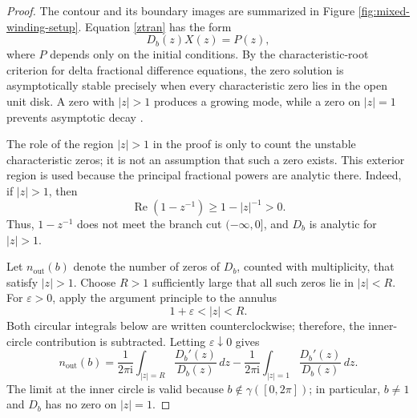 \documentclass[11pt,a4paper]{article}
\theoremstyle{definition}
\begin{document}
\begin{proof}
The contour and its boundary images are summarized in Figure \ref{fig:mixed-winding-setup}.
Equation \eqref{ztran} has the form
\begin{equation*}
D_b(z)X(z)=P(z),
\end{equation*}
where $P$ depends only on the initial conditions. By the characteristic-root criterion for delta fractional difference equations, the zero solution is asymptotically stable precisely when every characteristic zero lies in the open unit disk. A zero with $|z|>1$ produces a growing mode, while a zero on $|z|=1$ prevents asymptotic decay \cite{stanislawski2013stability,abu2013asymptotic,vcermak2015explicit,wei2024explicit}.

The role of the region $|z|>1$ in the proof is only to count the unstable characteristic zeros; it is not an assumption that such a zero exists. This exterior region is used because the principal fractional powers are analytic there. Indeed, if $|z|>1$, then
\begin{equation*}
\operatorname{Re}(1-z^{-1})
\geq 1-|z|^{-1}>0.
\end{equation*}
Thus, $1-z^{-1}$ does not meet the branch cut $(-\infty,0]$, and $D_b$ is analytic for $|z|>1$.

Let $n_{\mathrm{out}}(b)$ denote the number of zeros of $D_b$, counted with multiplicity, that satisfy $|z|>1$. Choose $R>1$ sufficiently large that all such zeros lie in $|z|<R$. For $\varepsilon>0$, apply the argument principle to the annulus
\begin{equation*}
1+\varepsilon<|z|<R.
\end{equation*}
Both circular integrals below are written counterclockwise; therefore, the inner-circle contribution is subtracted. Letting $\varepsilon\downarrow0$ gives
\begin{equation}\label{nout-mixed}
n_{\mathrm{out}}(b)
=\frac{1}{2\pi\mathrm{i}}\int_{|z|=R}\frac{D_b'(z)}{D_b(z)}\,dz
-\frac{1}{2\pi\mathrm{i}}\int_{|z|=1}\frac{D_b'(z)}{D_b(z)}\,dz.
\end{equation}
The limit at the inner circle is valid because $b\notin\gamma([0,2\pi])$; in particular, $b\neq1$ and $D_b$ has no zero on $|z|=1$.


\end{proof}
\end{document}

